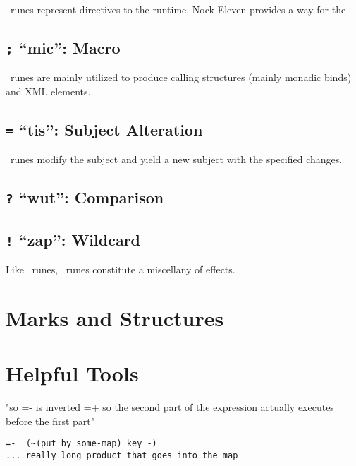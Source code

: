 
\psig~runes represent directives to the runtime.  Nock Eleven provides a way for the


\subsection{\texttt{;} “mic”:  Macro}

\mic~runes are mainly utilized to produce calling structures (mainly monadic binds) and XML elements.


\subsection{\texttt{=} “tis”:  Subject Alteration}

\tis~runes modify the subject and yield a new subject with the specified changes.

\subsection{\texttt{?} “wut”:  Comparison}

\subsection{\texttt{!} “zap”:  Wildcard}

Like \mic~runes, \pzap~runes constitute a miscellany of effects.

\section{Marks and Structures}

\section{Helpful Tools}


"so =- is inverted =+ so the second part of the expression actually executes before the first part"

\begin{lstlisting}
=-  (~(put by some-map) key -)
... really long product that goes into the map
\end{lstlisting}


